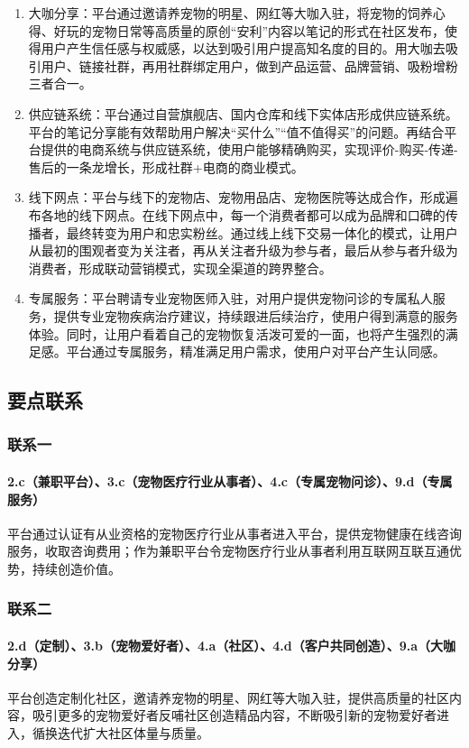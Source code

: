\documentclass[a4paper]{ctexart}
\begin{document}
\begin{enumerate}[label=\alph*.]
  \item 大咖分享：平台通过邀请养宠物的明星、网红等大咖入驻，将宠物的饲养心得、好玩的宠物日常等高质量的原创“安利”内容以笔记的形式在社区发布，使得用户产生信任感与权威感，以达到吸引用户提高知名度的目的。用大咖去吸引用户、链接社群，再用社群绑定用户，做到产品运营、品牌营销、吸粉增粉三者合一。
  \item 供应链系统：平台通过自营旗舰店、国内仓库和线下实体店形成供应链系统。平台的笔记分享能有效帮助用户解决“买什么”“值不值得买”的问题。再结合平台提供的电商系统与供应链系统，使用户能够精确购买，实现评价-购买-传递-售后的一条龙增长，形成社群+电商的商业模式。
  \item 线下网点：平台与线下的宠物店、宠物用品店、宠物医院等达成合作，形成遍布各地的线下网点。在线下网点中，每一个消费者都可以成为品牌和口碑的传播者，最终转变为用户和忠实粉丝。通过线上线下交易一体化的模式，让用户从最初的围观者变为关注者，再从关注者升级为参与者，最后从参与者升级为消费者，形成联动营销模式，实现全渠道的跨界整合。
  \item 专属服务：平台聘请专业宠物医师入驻，对用户提供宠物问诊的专属私人服务，提供专业宠物疾病治疗建议，持续跟进后续治疗，使用户得到满意的服务体验。同时，让用户看着自己的宠物恢复活泼可爱的一面，也将产生强烈的满足感。平台通过专属服务，精准满足用户需求，使用户对平台产生认同感。
\end{enumerate}


\subsection{要点联系}
\subsubsection{联系一}
\paragraph{2.c（兼职平台）、3.c（宠物医疗行业从事者）、4.c（专属宠物问诊）、9.d（专属服务）}平台通过认证有从业资格的宠物医疗行业从事者进入平台，提供宠物健康在线咨询服务，收取咨询费用；作为兼职平台令宠物医疗行业从事者利用互联网互联互通优势，持续创造价值。
\subsubsection{联系二}
\paragraph{2.d（定制）、3.b（宠物爱好者）、4.a（社区）、4.d（客户共同创造）、9.a（大咖分享）}平台创造定制化社区，邀请养宠物的明星、网红等大咖入驻，提供高质量的社区内容，吸引更多的宠物爱好者反哺社区创造精品内容，不断吸引新的宠物爱好者进入，循换迭代扩大社区体量与质量。
\end{document}
